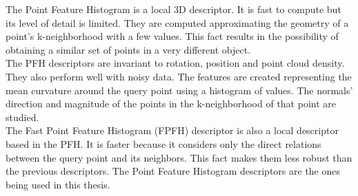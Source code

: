 The Point Feature Histogram \cite{Rusu2008} is a local 3D descriptor. 
It is fast to compute but its level of detail is limited. 
They are computed approximating the geometry of a point's k-neighborhood with a few values. 
This fact results in the possibility of obtaining a similar set of points in a very different object. 
\\

The PFH descriptors are invariant to rotation, position and point cloud density. 
They also perform well with noisy data. 
The features are created representing the mean curvature around the query point using a histogram of values. 
The normals' direction and magnitude of the points in the k-neighborhood of that point are studied. 
\\

The Fast Point Feature Histogram (FPFH) \cite{Rusu} descriptor is also a local descriptor based in the PFH. 
It is faster because it considers only the direct relations between the query point and its neighbors.
This fact makes them less robust than the previous descriptors. 
The Point Feature Histogram descriptors are the ones being used in this thesis. 


